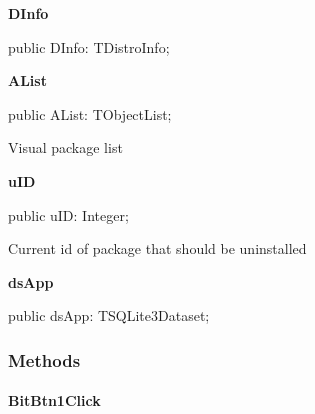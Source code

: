 \documentclass{report}
\newif\ifpdf
\begin{document}
\begin{list}{}
\par  \label{manager.TMnFrm-DInfo}
\item[\textbf{DInfo}\hfill]
\ifpdf
\begin{flushleft}
\fi
\begin{ttfamily}
public DInfo: TDistroInfo;\end{ttfamily}

\ifpdf
\end{flushleft}
\fi


\par  \label{manager.TMnFrm-AList}
\item[\textbf{AList}\hfill]
\ifpdf
\begin{flushleft}
\fi
\begin{ttfamily}
public AList: TObjectList;\end{ttfamily}

\ifpdf
\end{flushleft}
\fi


\par Visual package list\label{manager.TMnFrm-uID}
\item[\textbf{uID}\hfill]
\ifpdf
\begin{flushleft}
\fi
\begin{ttfamily}
public uID: Integer;\end{ttfamily}

\ifpdf
\end{flushleft}
\fi


\par Current id of package that should be uninstalled\label{manager.TMnFrm-dsApp}
\item[\textbf{dsApp}\hfill]
\ifpdf
\begin{flushleft}
\fi
\begin{ttfamily}
public dsApp: TSQLite3Dataset;\end{ttfamily}

\ifpdf
\end{flushleft}
\fi


\par  \end{list}
\subsubsection*{\large{\textbf{Methods}}\normalsize\hspace{1ex}\hfill}
\paragraph*{BitBtn1Click}\hspace*{\fill}
\end{document}
